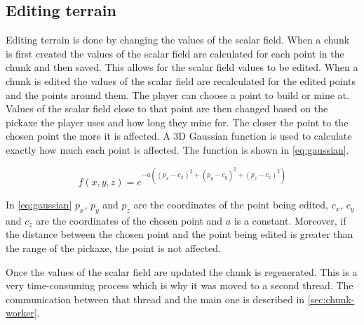 \subsection{Editing terrain} \label{sec:terrain_editing}
Editing terrain is done by changing the values of the scalar field.
When a chunk is first created the values of the scalar field are calculated for each point in the chunk and then saved.
This allows for the scalar field values to be edited.
When a chunk is edited the values of the scalar field are recalculated for the edited points and the points around them.
The player can choose a point to build or mine at.
Values of the scalar field close to that point are then changed based on the pickaxe the player uses and how long they mine for.
The closer the point to the chosen point the more it is affected.
A 3D Gaussian function is used to calculate exactly how much each point is affected.
The function is shown in \autoref{eq:gaussian}.

\begin{equation}
    \label{eq:gaussian}
    f(x,y,z) = e^{-a \left((p_x - c_x)^2 + (p_y - c_y)^2 + (p_z - c_z)^2\right)}
\end{equation}

In \autoref{eq:gaussian} $p_x$, $p_y$ and $p_z$ are the coordinates of the point being edited, $c_x$, $c_y$ and $c_z$ are the coordinates of the chosen point and $a$ is a constant.
Moreover, if the distance between the chosen point and the point being edited is greater than the range of the pickaxe, the point is not affected.

Once the values of the scalar field are updated the chunk is regenerated.
This is a very time-consuming process which is why it was moved to a second thread.
The communication between that thread and the main one is described in \autoref{sec:chunk-worker}.